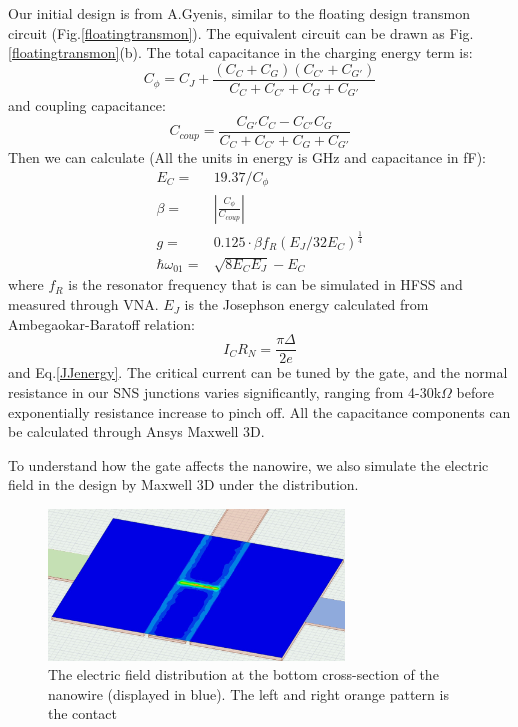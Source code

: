 Our initial design is from A.Gyenis, similar to the floating design transmon circuit (Fig.\ref{floatingtransmon}). The equivalent circuit can be drawn as Fig.\ref{floatingtransmon}(b). The total capacitance in the charging energy term is:
\begin{equation}
    C_{\phi} = C_J + \frac{(C_{C}+C_{G})(C_{C'}+C_{G'})}{C_{C}+C_{C'}+C_{G}+C_{G'}}
\end{equation}
and coupling capacitance:
\begin{equation}
    C_{coup} = \frac{C_{G'}C_{C}-C_{C'}C_{G}}{C_{C}+C_{C'}+C_{G}+C_{G'}}
\end{equation}
Then we can calculate (All the units in energy is GHz and capacitance in fF):
\begin{equation}
    \begin{array}{cc}
    E_C =& 19.37 / C_\phi \\
    \beta =& |\frac{C_\phi}{C_{coup}}| \\
    g =& 0.125\cdot\beta f_R (E_J/32E_C)^{\frac{1}{4}} \\
    \hbar\omega_{01} =& \sqrt{8E_CE_J} - E_C
    \end{array}
\end{equation}
where $f_R$ is the resonator frequency that is can be simulated in HFSS and measured through VNA. $E_J$ is the Josephson energy calculated from Ambegaokar-Baratoff relation\cite{RN39}:
\begin{equation}
    I_CR_N = \frac{\pi\Delta}{2e}
\end{equation}
and Eq.\ref{JJenergy}. The critical current can be tuned by the gate, and the normal resistance in our SNS junctions varies significantly, ranging from 4-30k$\Omega$ before exponentially resistance increase to pinch off. All the capacitance components can be calculated through Ansys Maxwell 3D.

To understand how the gate affects the nanowire, we also simulate the electric field in the design by Maxwell 3D under the distribution. 

\begin{figure}
    \centering
    \includegraphics[width=0.7\textwidth]{Pic/Sim_NWcapa.png}
    \caption{The electric field distribution at the bottom cross-section of the nanowire (displayed in blue). The left and right orange pattern is the contact}
    \label{fig:my_label}
\end{figure}

